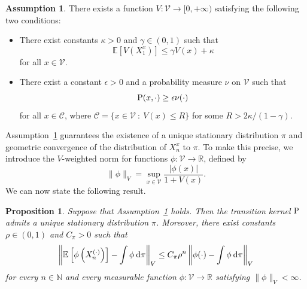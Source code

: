\documentclass[preprint,12pt]{elsarticle}
\newtheorem{prop}[thm]{Proposition}
\theoremstyle{definition}
\newtheorem{as}[thm]{Assumption}
\theoremstyle{remark}
\newcommand{\xbf}{{ x}}
\newcommand{\Xbf}{{ X}}
\newcommand{\1}{{\mathbf 1}}
\numberwithin{equation}{section}
\newcommand{\Ebb}{\mathbb{E}}  %
\newcommand{\ud}{{\rm d}}
\newcommand{\Prm}{{\rm P}}
\newcommand{\Vcal}{\mathcal{V}}
\begin{document}
  \begin{as}\label{as:2:mix}
    There exists a function $V \colon \Vcal \to [0, +\infty)$ 
    satisfying the following two conditions:  
    \begin{itemize}  
      \item [$(i)$] There exist constants $\kappa > 0$ and $\gamma \in (0,1)$ such that  
        \begin{equation*}  
          \Ebb[V(\Xbf_1^\xbf)] \leq \gamma V(\xbf) + \kappa  
        \end{equation*}  
        for all $\xbf \in \Vcal$.  
      \item [$(ii)$] There exist a constant $\epsilon>0$
        and a probability measure $\nu$ on $\Vcal$ such that
        \begin{equation}\label{eq:2:newbound}  
          \Prm(\xbf, \cdot) \geq \epsilon\nu(\cdot)
        \end{equation}  
        for all $\xbf \in \mathcal{C}$, where 
        $\mathcal{C} = \{ \xbf \in \Vcal \: : \: V(\xbf) \leq R \}$ 
        for some $R> 2\kappa/(1-\gamma)$.
    \end{itemize}
  \end{as}


  Assumption~\ref{as:2:mix} guarantees the existence of a unique stationary 
  distribution $\pi$ and geometric convergence of the distribution of 
  $\Xbf_n^\xbf$ to $\pi$. To make this precise, we introduce the $V$-weighted 
  norm for functions $\phi \colon \Vcal \to \mathbb{R}$, defined by
  \begin{equation*}  
    \|\phi\|_V = \sup_{\xbf \in \Vcal} \frac{|\phi(\xbf)|}{1+V(\xbf)}.  
  \end{equation*}  
  We can now state the following result.

  \begin{prop}\label{prop:2:mix}  
    Suppose that Assumption~\ref{as:2:mix} holds. 
    Then the transition kernel $\Prm$ admits a unique stationary distribution $\pi$. 
    Moreover, there exist constants $\rho \in (0,1)$ and $C_{\pi} > 0$ such that  
    \begin{equation*}  
      \left\| \Ebb \left[\phi\left(\Xbf_n^{(\cdot)}\right)\right] - \int \phi \: \ud \pi 
      \right\|_V \leq  
      C_{\pi} \rho^n \left\| \phi(\cdot) - \int \phi \: \ud \pi \right\|_V  
    \end{equation*}  
    for every $n \in \mathbb{N}$ and every measurable function 
    $\phi \colon \Vcal \to \mathbb{R}$ satisfying $\|\phi\|_V < \infty$.  
  \end{prop}
\end{document}

